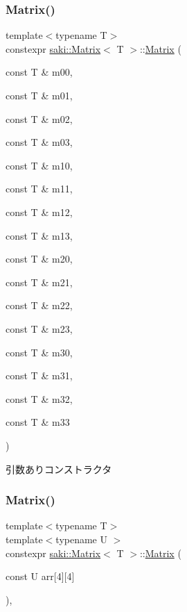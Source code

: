 \subsubsection{\texorpdfstring{Matrix()}{Matrix()}\hspace{0.1cm}{\footnotesize\ttfamily [2/6]}}
{\footnotesize\ttfamily template$<$typename T$>$ \\
constexpr \mbox{\hyperlink{classsaki_1_1_matrix}{saki\+::\+Matrix}}$<$ T $>$\+::\mbox{\hyperlink{classsaki_1_1_matrix}{Matrix}} (\begin{DoxyParamCaption}\item[{const T \&}]{m00,  }\item[{const T \&}]{m01,  }\item[{const T \&}]{m02,  }\item[{const T \&}]{m03,  }\item[{const T \&}]{m10,  }\item[{const T \&}]{m11,  }\item[{const T \&}]{m12,  }\item[{const T \&}]{m13,  }\item[{const T \&}]{m20,  }\item[{const T \&}]{m21,  }\item[{const T \&}]{m22,  }\item[{const T \&}]{m23,  }\item[{const T \&}]{m30,  }\item[{const T \&}]{m31,  }\item[{const T \&}]{m32,  }\item[{const T \&}]{m33 }\end{DoxyParamCaption})\hspace{0.3cm}{\ttfamily [inline]}}



引数ありコンストラクタ 

\mbox{\label{classsaki_1_1_matrix_a3d877c3e3581397370561be931972cb9}} 
\subsubsection{\texorpdfstring{Matrix()}{Matrix()}\hspace{0.1cm}{\footnotesize\ttfamily [3/6]}}
{\footnotesize\ttfamily template$<$typename T$>$ \\
template$<$typename U $>$ \\
constexpr \mbox{\hyperlink{classsaki_1_1_matrix}{saki\+::\+Matrix}}$<$ T $>$\+::\mbox{\hyperlink{classsaki_1_1_matrix}{Matrix}} (\begin{DoxyParamCaption}\item[{const U}]{arr\mbox{[}4\mbox{]}\mbox{[}4\mbox{]} }\end{DoxyParamCaption})\hspace{0.3cm}{\ttfamily [inline]}, {\ttfamily [explicit]}}



